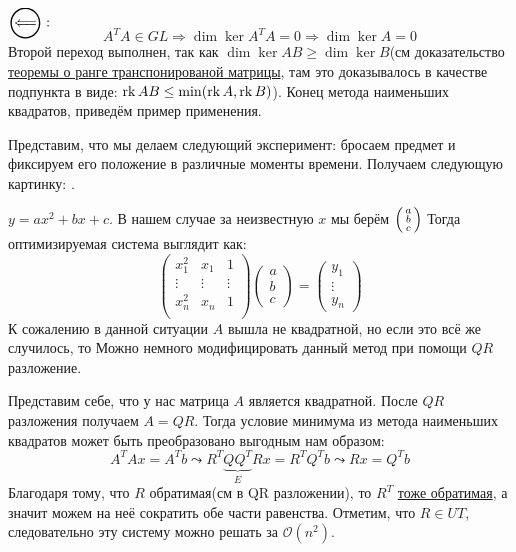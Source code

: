$\ola:$\\
\[
    A^T A \in GL \Rightarrow \dim \ker A^T A = 0 \Rightarrow \dim \ker A = 0
\]
Второй переход выполнен, так как $\dim \ker AB \ge \dim \ker B$(см доказательство
\hyperref[thm:О ранге транспонированной матрицы]{теоремы о ранге транспонированой матрицы},
там это доказывалось в качестве подпункта в виде: $\operatorname{rk} AB \le \min(\operatorname{rk} A, \operatorname{rk} B)$).
Конец метода наименьших квадратов, приведём пример применения.

\begin{example}
Представим, что мы делаем следующий эксперимент: бросаем предмет
и фиксируем его положение в различные моменты времени. Получаем
следующую картинку: .

$y= ax^2 + bx + c$.
В нашем случае за неизвестную $x$ мы берём $
\begin{psmallmatrix}
    a\\ b\\ c
\end{psmallmatrix}$
Тогда оптимизируемая система выглядит как:
\[
    \begin{pmatrix}
        x_1^2 & x_1 & 1\\
        \vdots & \vdots & \vdots\\
        x_n^2 & x_n & 1\\
    \end{pmatrix}
    \begin{pmatrix}
        a \\ b \\ c
    \end{pmatrix} 
    =
    \begin{pmatrix}
        y_1\\ \vdots \\ y_n
\end{pmatrix}
\]
К сожалению в данной ситуации $A$ вышла не квадратной, но если это всё же
случилось, то Можно немного модифицировать данный метод при помощи $QR$ разложение.
\end{example}

Представим себе, что у нас матрица $A$ является квадратной. После $QR$ разложения
получаем  $A = QR$.
Тогда условие минимума из метода наименьших квадратов может быть преобразовано выгодным
нам образом:
\[
   A^T A x = A^T b \leadsto R^T \underbrace{Q Q^T}_{E} Rx = R^T Q^Tb \leadsto
   Rx = Q^Tb
\]
Благодаря тому, что $R$ обратимая(см в QR разложении), то $R^T$ 
\hyperref[thm:О ранге транспонированной матрицы]{тоже обратимая},
а значит можем на неё сократить обе части равенства.
Отметим, что $R\in UT$, следовательно эту систему можно решать за $\mathcal{O}(n^2)$.
